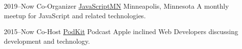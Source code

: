 \documentclass[]{cv-style} %
\begin{document}
\begin{entrylist}


\entry
{2019--Now}
{Co-Organizer {\normalfont \href{https://javascriptmn.com}{JavaScriptMN}}}
{Minneapolis, Minnesota}
{A monthly meetup for JavaScript and related technologies.}


\entry
{2015--Now}
{Co-Host {\normalfont \href{http://thenexus.tv/category/pk/}{PodKit}}}
{Podcast}
{Apple inclined Web Developers discussing development and technology.}


\end{entrylist}


%
%
%
%
%
\end{document}
